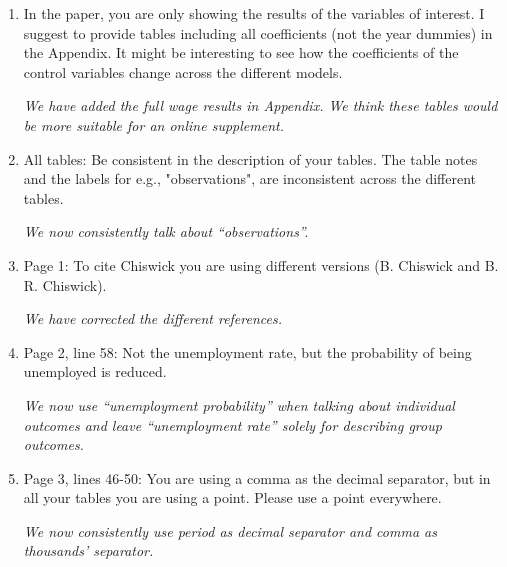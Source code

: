 \documentclass{article}
\newenvironment{response}
{\slshape}{}
\begin{document}
\begin{enumerate}
\item In the paper, you are only showing the results of the variables of
  interest. I suggest to provide tables including all coefficients (not
  the year dummies) in the Appendix. It might be interesting to see how
  the coefficients of the control variables change across the different
  models.

  \begin{response}
    We have added the full wage results in Appendix.  We think these
    tables would be more suitable for an online supplement.
  \end{response}
\item All tables: Be consistent in the description of your tables. The
table notes and the labels for e.g., "observations", are inconsistent
across the different tables. 

\begin{response}
  We now consistently talk about ``observations''.
\end{response}

\item Page 1: To cite Chiswick you are using different versions
(B. Chiswick and B. R. Chiswick).

\begin{response}
  We have corrected the different references.
\end{response}

\item Page 2, line 58: Not the unemployment rate, but the probability of
  being unemployed is reduced.

  \begin{response}
    We now use ``unemployment probability'' when talking about
    individual outcomes and leave ``unemployment rate'' solely for
    describing group outcomes.
  \end{response}

\item Page 3, lines 46-50: You are using a comma as the decimal separator, but in all your tables you are using a point. Please use a point everywhere. 

  \begin{response}
    We now consistently use period as decimal separator and comma as
    thousands' separator.
  \end{response}

\end{enumerate}
\end{document}
